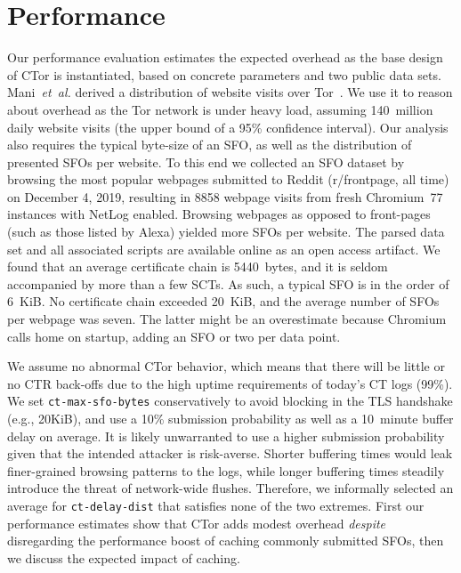 %
%
\section{Performance} \label{sec:performance}
Our performance evaluation estimates the expected overhead as the base design of
CTor is instantiated, based on concrete parameters and two public data sets.
Mani~\emph{et~al.} derived a distribution of website visits over
Tor~\cite{mani}.  We use it to reason about overhead as the Tor network is under
heavy load, assuming 140~million daily website visits (the upper bound of a 95\%
confidence interval).  Our analysis also requires the typical byte-size of an
SFO, as well as the distribution of presented SFOs per website.  To this end we
collected an SFO dataset by browsing the most popular webpages submitted to
Reddit (r/frontpage, all time) on December 4, 2019, resulting in 8858 webpage
visits from fresh Chromium~77 instances with NetLog enabled.  Browsing webpages
as opposed to front-pages (such as those listed by Alexa)
yielded more SFOs per website.  The parsed data set and all associated scripts
are available online as an open access artifact.
We found that an average certificate chain is 5440~bytes, and it is seldom
accompanied by more than a few SCTs.  As such, a typical SFO is in the order of
6~KiB.  No certificate chain exceeded 20~KiB, and the average number of SFOs per
webpage was seven.  The latter might be an overestimate because Chromium 
calls home on startup, adding an SFO or two per data point.

We assume no abnormal CTor behavior, which means that there will be little or
no CTR back-offs due to the high uptime requirements of today's CT logs (99\%).
We set \texttt{ct-max-sfo-bytes} conservatively to avoid blocking in the TLS
handshake (e.g., 20KiB), and use a 10\% submission probability as well as a
10~minute buffer delay on average.  It is likely unwarranted to use a higher
submission probability given that the intended attacker is risk-averse.  Shorter
buffering times would leak finer-grained browsing patterns to the logs, while
longer buffering times steadily introduce the threat of network-wide flushes.
Therefore, we informally selected an average for \texttt{ct-delay-dist} that
satisfies none of the two extremes.
First our performance estimates show that CTor adds modest overhead
\emph{despite} disregarding the performance boost of caching commonly submitted
SFOs, then we discuss the expected impact of caching.

